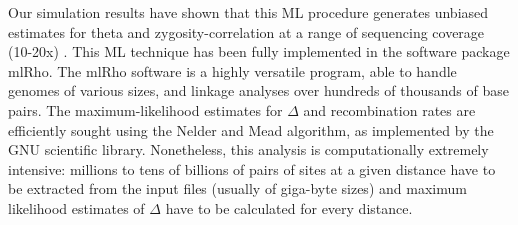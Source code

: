 \documentclass{sig-alternate}
\begin{document}





Our simulation results have shown that this ML procedure generates unbiased estimates for theta and
zygosity-correlation at a range of sequencing coverage (10-20x) \cite{Lynch01112008}.  This ML technique has
been fully implemented in the software package mlRho. The mlRho software is a highly
versatile program, able to handle genomes of various sizes, and linkage analyses over hundreds of thousands of
base pairs. The maximum-likelihood estimates for $\Delta$ and recombination rates are efficiently sought using
the Nelder and Mead algorithm, as implemented by the GNU scientific library. Nonetheless, this analysis is
computationally extremely intensive: millions to tens of billions of pairs of sites at a given distance have
to be extracted from the input files (usually of giga-byte sizes) and maximum likelihood estimates of $\Delta$
have to be calculated for every distance.
\end{document}
